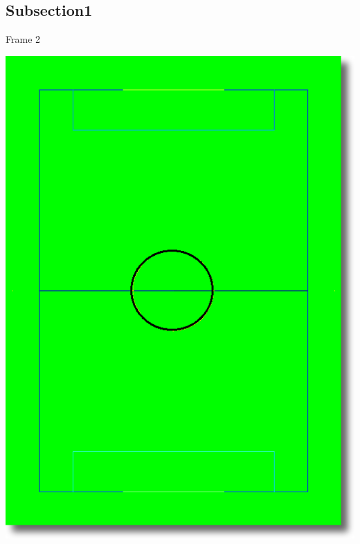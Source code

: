 \documentclass[ucs,9pt]{beamer}
\begin{document}
\subsection{Subsection1}
\begin{frame}{Frame 2}
	\begin{center}
		\includegraphics[width=\textwidth,height=0.8\textheight,keepaspectratio]{img/model2-shadow}

\end{center}
\end{frame}
\end{document}
